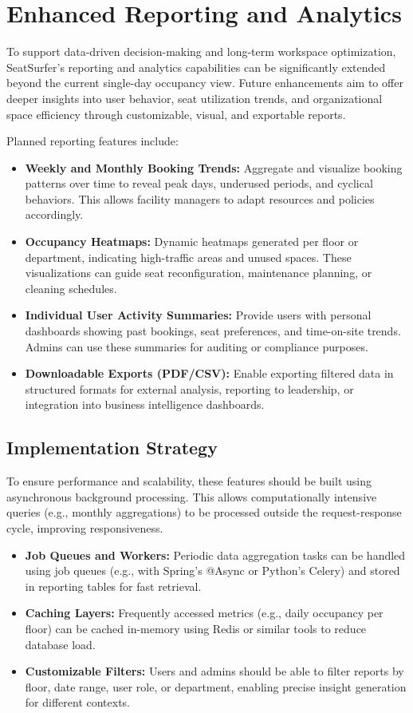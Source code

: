 \documentclass[12pt,a4paper]{report}
\begin{document}
\section{Enhanced Reporting and Analytics}

To support data-driven decision-making and long-term workspace optimization, SeatSurfer's reporting and analytics capabilities can be significantly extended beyond the current single-day occupancy view. Future enhancements aim to offer deeper insights into user behavior, seat utilization trends, and organizational space efficiency through customizable, visual, and exportable reports.

Planned reporting features include:

\begin{itemize}
\item \textbf{Weekly and Monthly Booking Trends:}
Aggregate and visualize booking patterns over time to reveal peak days, underused periods, and cyclical behaviors. This allows facility managers to adapt resources and policies accordingly.
\item \textbf{Occupancy Heatmaps:}  
Dynamic heatmaps generated per floor or department, indicating high-traffic areas and unused spaces. These visualizations can guide seat reconfiguration, maintenance planning, or cleaning schedules.
\item \textbf{Individual User Activity Summaries:}  
Provide users with personal dashboards showing past bookings, seat preferences, and time-on-site trends. Admins can use these summaries for auditing or compliance purposes.
\item \textbf{Downloadable Exports (PDF/CSV):}  
Enable exporting filtered data in structured formats for external analysis, reporting to leadership, or integration into business intelligence dashboards.
\end{itemize}

\subsection*{Implementation Strategy}

To ensure performance and scalability, these features should be built using asynchronous background processing. This allows computationally intensive queries (e.g., monthly aggregations) to be processed outside the request-response cycle, improving responsiveness.

\begin{itemize}
\item \textbf{Job Queues and Workers:}
Periodic data aggregation tasks can be handled using job queues (e.g., with Spring's @Async or Python's Celery) and stored in reporting tables for fast retrieval.
\item \textbf{Caching Layers:}  
Frequently accessed metrics (e.g., daily occupancy per floor) can be cached in-memory using Redis or similar tools to reduce database load.
\item \textbf{Customizable Filters:}  
Users and admins should be able to filter reports by floor, date range, user role, or department, enabling precise insight generation for different contexts.
\end{itemize}
\end{document}
